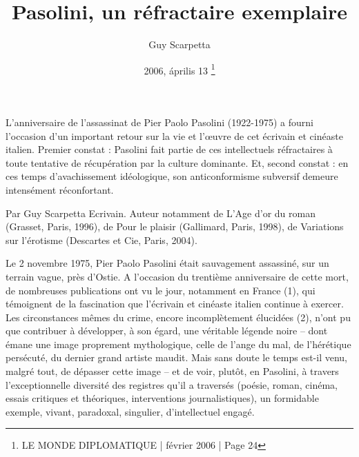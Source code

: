 \documentclass[a4paper,twocolumn]{article}
\begin{document}
\author{Guy Scarpetta}
\title{  Pasolini, un réfractaire exemplaire }
\date{2006, április 13 \thanks{LE MONDE DIPLOMATIQUE | février 2006 | Page 24  } }
\topmargin -1.8cm        %
\oddsidemargin -1.8cm   %
\evensidemargin -1.8cm  %
\textwidth      7.5in
\textheight	10.0in
\maketitle




L’anniversaire de l’assassinat de Pier Paolo Pasolini (1922-1975) a fourni l’occasion d’un important retour sur la vie et l’œuvre de cet écrivain et cinéaste italien. Premier constat : Pasolini fait partie de ces intellectuels réfractaires à toute tentative de récupération par la culture dominante. Et, second constat : en ces temps d’avachissement idéologique, son anticonformisme subversif demeure intensément réconfortant.

 

Par Guy Scarpetta
Ecrivain. Auteur notamment de L’Age d’or du roman (Grasset, Paris, 1996), de Pour le plaisir (Gallimard, Paris, 1998), de Variations sur l’érotisme (Descartes et Cie, Paris, 2004).




		

Le 2 novembre 1975, Pier Paolo Pasolini était sauvagement assassiné, sur un terrain vague, près d’Ostie. A l’occasion du trentième anniversaire de cette mort, de nombreuses publications ont vu le jour, notamment en France  (1), qui témoignent de la fascination que l’écrivain et cinéaste italien continue à exercer. Les circonstances mêmes du crime, encore incomplètement élucidées  (2), n’ont pu que contribuer à développer, à son égard, une véritable légende noire – dont émane une image proprement mythologique, celle de l’ange du mal, de l’hérétique persécuté, du dernier grand artiste maudit. Mais sans doute le temps est-il venu, malgré tout, de dépasser cette image – et de voir, plutôt, en Pasolini, à travers l’exceptionnelle diversité des registres qu’il a traversés (poésie, roman, cinéma, essais critiques et théoriques, interventions journalistiques), un formidable exemple, vivant, paradoxal, singulier, d’intellectuel engagé.
\end{document}
